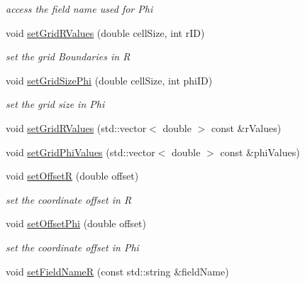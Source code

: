 \begin{DoxyCompactItemize}
\begin{DoxyCompactList}\small\item\em access the field name used for Phi \item\end{DoxyCompactList}\item 
void \hyperlink{class_d_d4hep_1_1_d_d_segmentation_1_1_polar_grid_r_phi2_a2194e846c26953f06cc74481d8aadeb4}{setGridRValues} (double cellSize, int rID)
\begin{DoxyCompactList}\small\item\em set the grid Boundaries in R \item\end{DoxyCompactList}\item 
void \hyperlink{class_d_d4hep_1_1_d_d_segmentation_1_1_polar_grid_r_phi2_a349f115397bac2c6c4891353bcfd88b0}{setGridSizePhi} (double cellSize, int phiID)
\begin{DoxyCompactList}\small\item\em set the grid size in Phi \item\end{DoxyCompactList}\item 
void \hyperlink{class_d_d4hep_1_1_d_d_segmentation_1_1_polar_grid_r_phi2_a6d8ed0487267fd1b67bc0d76b2f41b3a}{setGridRValues} (std::vector$<$ double $>$ const \&rValues)
\item 
void \hyperlink{class_d_d4hep_1_1_d_d_segmentation_1_1_polar_grid_r_phi2_a738e77165e575ee463fab4e5daec543b}{setGridPhiValues} (std::vector$<$ double $>$ const \&phiValues)
\item 
void \hyperlink{class_d_d4hep_1_1_d_d_segmentation_1_1_polar_grid_r_phi2_afe071e7c5168bda97cac7c4a64c9265e}{setOffsetR} (double offset)
\begin{DoxyCompactList}\small\item\em set the coordinate offset in R \item\end{DoxyCompactList}\item 
void \hyperlink{class_d_d4hep_1_1_d_d_segmentation_1_1_polar_grid_r_phi2_aa2807e9eae64b363d6a19cc605de5b81}{setOffsetPhi} (double offset)
\begin{DoxyCompactList}\small\item\em set the coordinate offset in Phi \item\end{DoxyCompactList}\item 
void \hyperlink{class_d_d4hep_1_1_d_d_segmentation_1_1_polar_grid_r_phi2_aac669f48623b5176e941a1e66fde5877}{setFieldNameR} (const std::string \&fieldName)

\end{DoxyCompactItemize}
